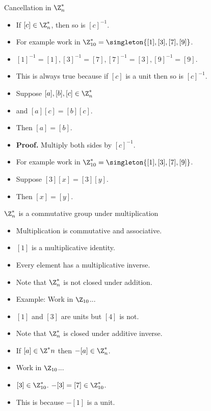 \documentclass[handout]{beamer}
\begin{document}
\begin{frame}{Cancellation in $\Z^*_n$}

\begin{itemize}
  \item If $[c]\in\Z_n^*$, then so is $[c]^{-1}$.
  \item For example work in  $\Z_{10}^* = \singleton{[1],[3],[7],[9]}$.
  \item $[1]^{-1} = [1], [3]^{-1}=[7], [7]^{-1} = [3], [9]^{-1} = [9]$.
  \item This is always true because if $[c]$ is a unit then so is $[c]^{-1}$.
  \item Suppose $[a],[b],[c] \in \Z_n^*$
  \item and $[a][c] = [b][c]$.
  \item Then $[a] = [b]$.
  \item \textbf{Proof.} Multiply both sides by $[c]^{-1}$.
  \item For example work in  $\Z_{10}^* = \singleton{[1],[3],[7],[9]}$.
  \item Suppose $[3][x] = [3][y]$.
  \item Then $[x] = [y]$.
\end{itemize}

\end{frame}

\begin{frame}{$\Z^*_n$ is a commutative group under multiplication}

\begin{itemize}
  \item Multiplication is commutative and associative.
  \item $[1]$ is a multiplicative identity.
  \item Every element has a multiplicative inverse.
  \item Note that $\Z^*_n$ is not closed under addition.
  \item Example: Work in $\Z_{10}$...
  \item $[1]$ and $[3]$ are units but $[4]$ is not.
  \item Note that $\Z^*_n$ is closed under additive inverse.
  \item If $[a]\in\Z^*n$ then $-[a]\in\Z^*_n$.
  \item Work in $\Z_{10}$...
  \item $[3]\in\Z^*_{10}$. $-[3]=[7]\in\Z^*_{10}$.
  \item This is because $-[1]$ is a unit.
\end{itemize}

\end{frame}
\end{document}
